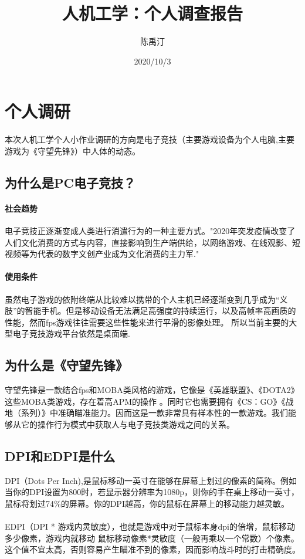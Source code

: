 \documentclass[UTF8]{ctexart}
\title{人机工学：个人调查报告}
\author{陈禹汀}
\date{2020/10/3}
\begin{document}
\maketitle%
\newpage
\tableofcontents%
\newpage
\section{个人调研}
    本次人机工学个人小作业调研的方向是电子竞技（主要游戏设备为个人电脑,主要游戏为《守望先锋》）中人体的动态。
\subsection{为什么是PC电子竞技？}
\paragraph{社会趋势}
    电子竞技正逐渐变成人类进行消遣行为的一种主要方式。"2020年突发疫情改变了人们文化消费的方式与内容，直接影响到生产端供给，以网络游戏、在线观影、短视频等为代表的数字文创产业成为文化消费的主力军." \cite{esports}
\paragraph{使用条件}
    虽然电子游戏的依附终端从比较难以携带的个人主机已经逐渐变到几乎成为“义肢”的智能手机。但是移动设备无法满足高强度的持续运行，以及高帧率高画质的性能，然而fps游戏往往需要这些性能来进行平滑的影像处理。 \cite{framerate}所以当前主要的大型电子竞技游戏平台依然是桌面端.
\subsection{为什么是《守望先锋》}
    守望先锋是一款结合fps和MOBA类风格的游戏，它像是《英雄联盟》、《DOTA2》这些MOBA类游戏，存在着高APM的操作 \cite{wiki:APM}。同时它也需要拥有《CS：GO》《战地（系列）》中准确瞄准能力。因而这是一款非常具有样本性的一款游戏。我们能够从它的操作行为模式中获取人与电子竞技类游戏之间的关系。
\subsection{DPI和EDPI是什么}
    DPI（Dots Per Inch),是鼠标移动一英寸在能够在屏幕上划过的像素的简称。例如当你的DPI设置为800时，若显示器分辨率为1080p，则你的手在桌上移动一英寸，鼠标将划过74\%的屏幕。你的DPI越高，你的鼠标在屏幕上的移动能力越灵敏。\cite{prosetting_dpi}
\paragraph{}
    EDPI（DPI * 游戏内灵敏度），也就是游戏中对于鼠标本身dpi的倍增，鼠标移动多少像素，游戏内就移动 鼠标移动像素*灵敏度（一般再乘以一个常数）个像素。这个值不宜太高，否则容易产生瞄准不到的像素，因而影响战斗时的打击精确度。
\newpage
\end{document}
